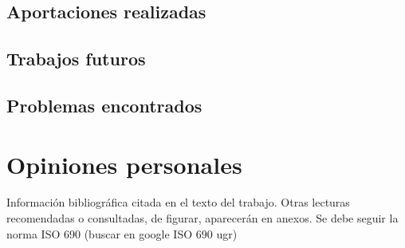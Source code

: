 \documentclass[12pt,a4paper,onecolumn,oneside]{report}
\begin{document}
\subsection*{Aportaciones realizadas}



\subsection*{Trabajos futuros}



\subsection*{Problemas encontrados}



\section*{Opiniones personales}




\renewcommand\bibname{Lista de referencias}

Información bibliográfica citada en el texto del trabajo. Otras lecturas recomendadas o consultadas, de figurar, aparecerán en anexos.
Se debe seguir la norma ISO 690 (buscar en google ISO 690 ugr)
\end{document}
